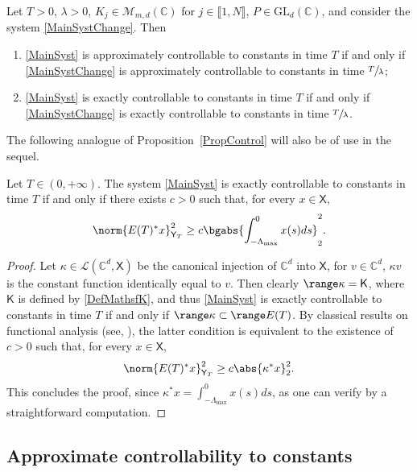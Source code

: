 \begin{lemm}
\label{LemmInvariantConstants}
Let $T > 0$, $\lambda > 0$, $K_j \in \mathcal M_{m, d}(\mathbb C)$ for $j \in \llbracket 1, N\rrbracket$, $P \in \mathrm{GL}_d(\mathbb C)$, and consider the system \eqref{MainSystChange}. Then
\begin{enumerate}
\item\label{ApproxContrlConstIff} \eqref{MainSyst} is approximately controllable to constants in time $T$ if and only if \eqref{MainSystChange} is approximately controllable to constants in time $\sfrac{T}{\lambda}$;

\item\label{ExactContrlConstIff} \eqref{MainSyst} is exactly controllable to constants in time $T$ if and only if \eqref{MainSystChange} is exactly controllable to constants in time $\sfrac{T}{\lambda}$.
\end{enumerate}
\end{lemm}

The following analogue of Proposition~\ref{PropControl} will also be of use in the sequel.

\begin{prop}
\label{PropInegObservConst}
Let $T \in (0, +\infty)$. The system \eqref{MainSyst} is exactly controllable to constants in time $T$ if and only if there exists $c > 0$ such that, for every $x \in \mathsf X$,
\[
\norm{E(T)^\ast x}_{\mathsf Y_T}^2 \geq c \bgabs{\int_{-\Lambda_{\max}}^0 x(s) ds}_2^2.
\]
\end{prop}

\begin{proof}
Let $\kappa \in \mathcal L(\mathbb C^d, \mathsf X)$ be the canonical injection of $\mathbb C^d$ into $\mathsf X$, \ie for $v \in \mathbb C^d$, $\kappa v$ is the constant function identically equal to $v$. Then clearly $\range \kappa = \mathsf K$, where $\mathsf K$ is defined by \eqref{DefMathsfK}, and thus \eqref{MainSyst} is exactly controllable to constants in time $T$ if and only if $\range \kappa \subset \range E(T)$. By classical results on functional analysis (see, \eg \cite[Lem.\,2.48]{Coron2007Control}), the latter condition is equivalent to the existence of $c > 0$ such that, for every $x \in \mathsf X$,
\[
\norm{E(T)^\ast x}_{\mathsf Y_T}^2 \geq c \abs{\kappa^\ast x}_2^2.
\]
This concludes the proof, since $\kappa^\ast x = \int_{-\Lambda_{\max}}^0 x(s) ds$, as one can verify by a straightforward computation.
\end{proof}

\subsection{Approximate controllability to constants}
\label{SecApproxToConst}


